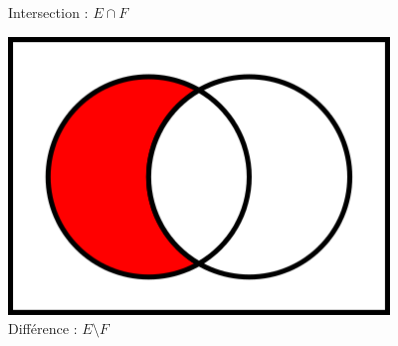 \documentclass[10pt,a4paper,oneside]{book}
\begin{document}
\begin{figure}
\begin{minipage}{0.3\textwidth}
        \caption{Intersection :  $E \cap F$}
    \end{minipage}
    \begin{minipage}{0.3\textwidth}
        \centering
        \includegraphics[width=0.9\textwidth]{Venn0100.png}
        \caption{Différence : $E \setminus F$}
    \end{minipage}
\end{figure}
   
\end{document}
